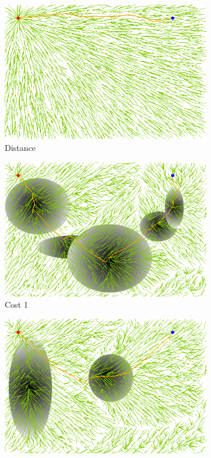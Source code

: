 \documentclass{article}
\begin{document}
\begin{figure}[h!]
	\centering
	\begin{subfigure}[b]{0.26\linewidth}
		\centering
		\includegraphics[width=\textwidth]{fig/sim6-3obj/MORRTstar02-0.png}
		\caption{Distance}
		\label{fig:sim:many:distance}
	\end{subfigure}
	\begin{subfigure}[b]{0.26\linewidth}
		\centering
		\includegraphics[width=\textwidth]{fig/sim6-3obj/MORRTstar02-1.png}
		\caption{Cost 1}
		\label{fig:sim:many:fitness1}
	\end{subfigure}
	\begin{subfigure}[b]{0.26\linewidth}
		\centering
		\includegraphics[width=\textwidth]{fig/sim6-3obj/MORRTstar02-2.png}

\end{subfigure}
\end{figure}
\end{document}
